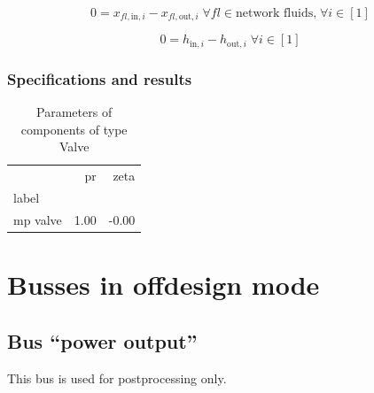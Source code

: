 \documentclass[]{article}
\begin{document}
\begin{equation}
\label{eq:Valve_fluid_constraints}
0=x_{fl\mathrm{,in,}i}-x_{fl\mathrm{,out,}i}\;\forall fl \in\text{network fluids,}\; \forall i \in [1]
\end{equation}

\begin{equation}
\label{eq:Valve_enthalpy_equality_constraints}
0=h_{\mathrm{in,}i}-h_{\mathrm{out,}i}\; \forall i \in [1]
\end{equation}


\subsubsection{Specifications and results}

\begin{table}[H]
\centering
\caption{Parameters of components of type Valve}
\begin{tabular}{lrr}
\toprule
{} &    pr &   zeta \\
label    &       &        \\
\midrule
mp valve &  1.00 &  -0.00 \\
\bottomrule
\end{tabular}
\end{table}
\section{Busses in offdesign mode}

\subsection{Bus ``power output''}

This bus is used for postprocessing only.
\end{document}
